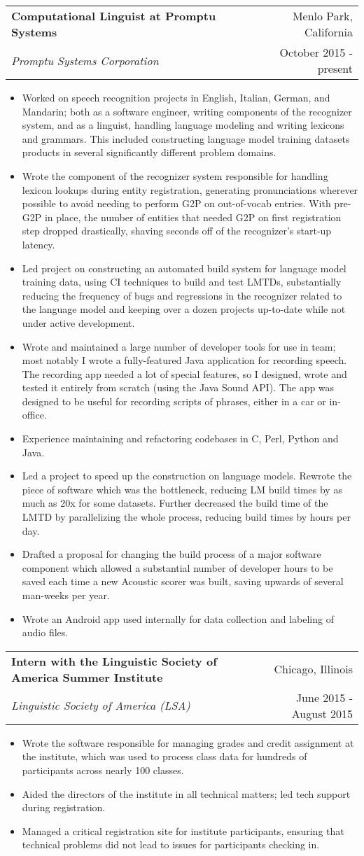 \documentclass[letterpaper,10pt]{article}
\makeatletter
\newcommand{\resitem}[1]{
    \item #1 \vspace{-2pt}
}
\newcommand{\ressubheading}[4]{
    \begin{tabular*}{7in}{
        l@{\cftdotfill{\cftsecdotsep}\extracolsep{\fill}}r}
		    \textbf{#1} & #2 \\
		    \textit{#3} & #4 \\
    \end{tabular*}
    \vspace{-6pt}}
\makeatother
\begin{document}
\ressubheading{Computational Linguist at Promptu Systems}{Menlo Park, California}{Promptu Systems Corporation}{October 2015 - present}
\begin{itemize}
    \resitem{Worked on speech recognition projects in English, Italian, German, and Mandarin; both as a software engineer, writing components of the recognizer system, and as a linguist, handling language modeling and writing lexicons and grammars. This included constructing language model training datasets products in several significantly different problem domains.}
    \resitem{Wrote the component of the recognizer system responsible for handling lexicon lookups during entity registration, generating pronunciations wherever possible to avoid needing to perform G2P on out-of-vocab entries. With pre-G2P in place, the number of entities that needed G2P on first registration step dropped drastically, shaving seconds off of the recognizer's start-up latency.}
    \resitem{Led project on constructing an automated build system for language model training data, using CI techniques to build and test LMTDs, substantially reducing the frequency of bugs and regressions in the recognizer related to the language model and keeping over a dozen projects up-to-date while not under active development.}
    \resitem{Wrote and maintained a large number of developer tools for use in team; most notably I wrote a fully-featured Java application for recording speech. The recording app needed a lot of special features, so I designed, wrote and tested it entirely from scratch (using the Java Sound API). The app was designed to be useful for recording scripts of phrases, either in a car or in-office.}
    \resitem{Experience maintaining and refactoring codebases in C, Perl, Python and Java.}
    \resitem{Led a project to speed up the construction on language models. Rewrote the piece of software which was the bottleneck, reducing LM build times by as much as 20x for some datasets. Further decreased the build time of the LMTD by parallelizing the whole process, reducing build times by hours per day.}
    \resitem{Drafted a proposal for changing the build process of a major software component which allowed a substantial number of developer hours to be saved each time a new Acoustic scorer was built, saving upwards of several man-weeks per year.}
    \resitem{Wrote an Android app used internally for data collection and labeling of audio files.}
\end{itemize}

\ressubheading{Intern with the Linguistic Society of America Summer Institute}{Chicago, Illinois}{Linguistic Society of America (LSA)}{June 2015 - August 2015}
\begin{itemize}
	\resitem{Wrote the software responsible for managing grades and credit assignment at the institute, which was used to process class data for hundreds of participants across nearly 100 classes.} 
	\resitem{Aided the directors of the institute in all technical matters; led tech support during registration.}
	\resitem{Managed a critical registration site for institute participants, ensuring that technical problems did not lead to issues for participants checking in.}
\end{itemize}
\end{document}
